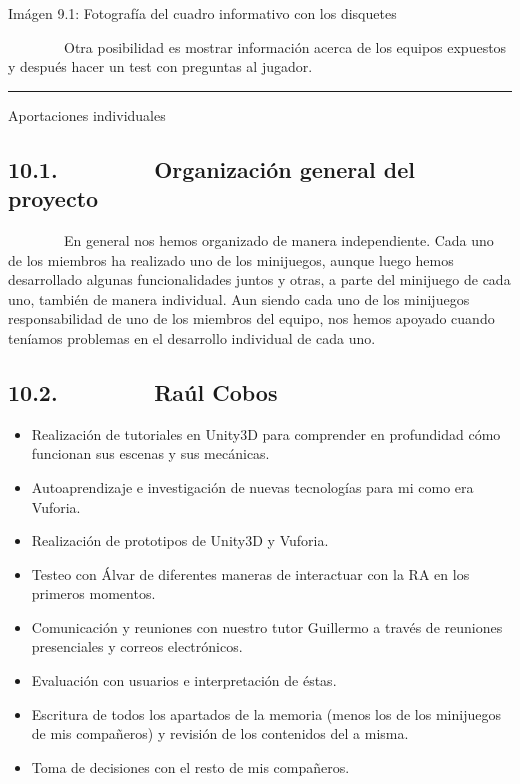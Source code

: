 \documentclass[]{article}
\begin{document}
Imágen 9.1: Fotografía del cuadro informativo con los disquetes

~~~~~~~~Otra posibilidad es mostrar información acerca de los equipos
expuestos y después hacer un test con preguntas al jugador.

\begin{center}\rule{3in}{0.4pt}\end{center}


Aportaciones individuales

\subsection{10.1.~~~~~~~~Organización general del proyecto}

~~~~~~~~En general nos hemos organizado de manera independiente. Cada
uno de los miembros ha realizado uno de los minijuegos, aunque luego
hemos desarrollado algunas funcionalidades juntos y otras, a parte del
minijuego de cada uno, también de manera individual. Aun siendo cada uno
de los minijuegos responsabilidad de uno de los miembros del equipo, nos
hemos apoyado cuando teníamos problemas en el desarrollo individual de
cada uno.

\subsection{10.2.~~~~~~~~Raúl Cobos}\label{h.4k668n3}

\begin{itemize}
\itemsep1pt\parskip0pt
\item
  Realización de tutoriales en Unity3D para comprender en profundidad
  cómo funcionan sus escenas y sus mecánicas.
\item
  Autoaprendizaje e investigación de nuevas tecnologías para mi como era
  Vuforia.
\item
  Realización de prototipos de Unity3D y Vuforia.
\item
  Testeo con Álvar de diferentes maneras de interactuar con la RA en los
  primeros momentos.
\item
  Comunicación y reuniones con nuestro tutor Guillermo a través de
  reuniones presenciales y correos electrónicos.
\item
  Evaluación con usuarios e interpretación de éstas.
\item
  Escritura de todos los apartados de la memoria (menos los de los
  minijuegos de mis compañeros) y revisión de los contenidos del a
  misma.
\item
  Toma de decisiones con el resto de mis compañeros.
\end{itemize}
\end{document}
